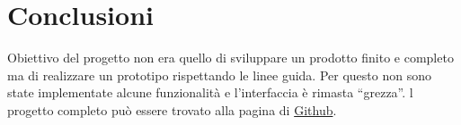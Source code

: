 \documentclass[a4paper, 11pt]{article}
\begin{document}
		\section{Conclusioni}
		Obiettivo del progetto non era quello di sviluppare un prodotto finito e completo ma di realizzare un prototipo rispettando le linee guida. Per questo non sono state implementate alcune funzionalità e l'interfaccia è rimasta ``grezza''. 
		l progetto completo può essere trovato alla pagina di \href{https://github.com/zetaemme/drug-supervision}{Github}. 
		
\end{document}

